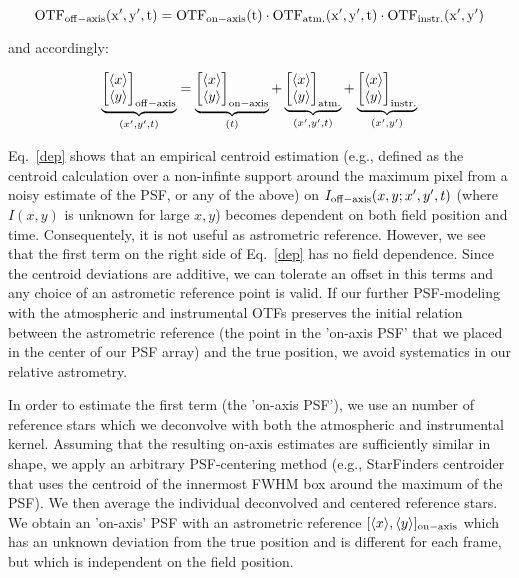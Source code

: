 \documentclass[a4paper]{article}
\begin{document}
\begin{equation}\label{dep}
\rm{OTF}_{\rm{off-axis}}(x',y',t)  =  \rm{OTF}_{\rm{on-axis}}(t)  \cdot  \rm{OTF}_{\rm{atm.}}(x',y',t)  \cdot  \rm{OTF}_{\rm{instr.}}(x',y')
\end{equation} 

and accordingly:

\begin{equation}
\underbrace{\begin{bmatrix}
        \langle x \rangle \\ \langle y \rangle \end{bmatrix}_{\rm{off-axis}}}_{(x',y',t)} = \underbrace{\begin{bmatrix} \langle x \rangle \\ \langle y \rangle\end{bmatrix}_{\rm{on-axis}}}_{(t)} + \underbrace{\begin{bmatrix}\langle x \rangle \\ \langle y \rangle\end{bmatrix}_{\rm{atm.}}}_{(x',y',t)} + \underbrace{\begin{bmatrix}\langle x \rangle \\ \langle y \rangle\end{bmatrix}_{\rm{instr.}}}_{(x',y')}
\end{equation}

 
Eq.~\ref{dep} shows that an empirical centroid estimation (e.g., defined as the centroid calculation over a non-infinte support around the maximum pixel from a noisy estimate of the PSF, or any of the above) on $I_{\rm{off-axis}}(x,y; x',y',t)$ (where $I(x,y)$ is unknown for large $x,y$) becomes dependent on both field position and time. Consequentely, it is not useful as astrometric reference. However, we see that the first term on the right side of Eq.~\ref{dep} has no field dependence. Since the centroid deviations are additive, we can tolerate an offset in this terms and any choice of an astrometic reference point is valid. If our further PSF-modeling with the atmospheric and instrumental OTFs preserves the initial relation between the astrometric reference (the point in the 'on-axis PSF' that we placed in the center of our PSF array) and the true position, we avoid systematics in our relative astrometry.

In order to estimate the first term (the 'on-axis PSF'), we use an number of reference stars which we deconvolve with both the atmospheric and instrumental kernel. Assuming that the resulting on-axis estimates are sufficiently similar in shape, we apply an arbitrary PSF-centering method (e.g., StarFinders centroider that uses the centroid of the innermost FWHM box around the maximum of the PSF). We then average the individual deconvolved and centered reference stars. We obtain an 'on-axis' PSF with an astrometric reference $[\langle x \rangle , \langle y \rangle]_{\rm{on-axis}}$ which has an unknown deviation from the true position and is different for each frame, but which is independent on the field position. 
\end{document}

